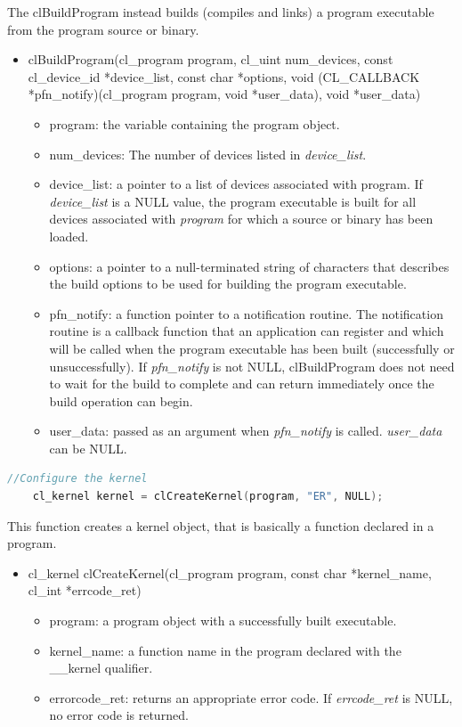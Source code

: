 \documentclass[titlepage]{article}
\begin{document}
The clBuildProgram instead builds (compiles and links) a program executable from the program source or binary.

\begin{itemize}
    \item clBuildProgram(cl\_program program, cl\_uint num\_devices, const cl\_device\_id *device\_list, const char *options, void (CL\_CALLBACK *pfn\_notify)(cl\_program program, void *user\_data), void *user\_data)
    \begin{itemize}
        \item program: the variable containing the program object.
        \item num\_devices: The number of devices listed in \textit{device\_list}.
        \item device\_list: a pointer to a list of devices associated with program. If \textit{device\_list} is a NULL value, the program executable is built for all devices associated with \textit{program} for which a source or binary has been loaded.
        \item options: a pointer to a null-terminated string of characters that describes the build options to be used for building the program executable.
        \item pfn\_notify: a function pointer to a notification routine. The notification routine is a callback function that an application can register and which will be called when the program executable has been built (successfully or unsuccessfully). If \textit{pfn\_notify} is not NULL, clBuildProgram does not need to wait for the build to complete and can return immediately once the build operation can begin.
        \item user\_data: passed as an argument when \textit{pfn\_notify} is called. \textit{user\_data} can be NULL.
    \end{itemize}
\end{itemize}

\begin{minipage}{\linewidth}
\begin{lstlisting}[language=C, style=customc, breaklines=true]
    //Configure the kernel
    cl_kernel kernel = clCreateKernel(program, "ER", NULL);
\end{lstlisting}
\end{minipage}

This function creates a kernel object, that is basically a function declared in a program.

\begin{itemize}
    \item cl\_kernel clCreateKernel(cl\_program program, const char *kernel\_name, cl\_int *errcode\_ret)
    \begin{itemize}
        \item program: a program object with a successfully built executable.
        \item kernel\_name: a function name in the program declared with the \_\_kernel qualifier.
        \item errorcode\_ret: returns an appropriate error code. If \textit{errcode\_ret} is NULL, no error code is returned.
    \end{itemize}
\end{itemize}
\end{document}
